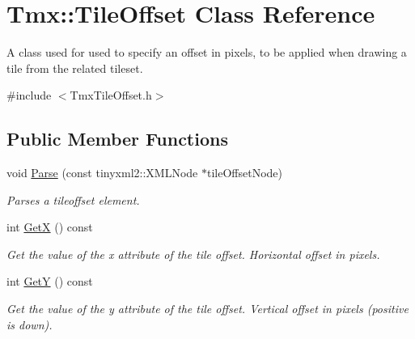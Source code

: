 \hypertarget{classTmx_1_1TileOffset}{\section{Tmx\-:\-:Tile\-Offset Class Reference}
\label{classTmx_1_1TileOffset}
}


A class used for used to specify an offset in pixels, to be applied when drawing a tile from the related tileset.  




{\ttfamily \#include $<$Tmx\-Tile\-Offset.\-h$>$}

\subsection*{Public Member Functions}
\begin{DoxyCompactItemize}
\item 
\hypertarget{classTmx_1_1TileOffset_aa3efdc7be635e7ea4aebce9f04198a30}{void \hyperlink{classTmx_1_1TileOffset_aa3efdc7be635e7ea4aebce9f04198a30}{Parse} (const tinyxml2\-::\-X\-M\-L\-Node $\ast$tile\-Offset\-Node)}\label{classTmx_1_1TileOffset_aa3efdc7be635e7ea4aebce9f04198a30}

\begin{DoxyCompactList}\small\item\em Parses a tileoffset element. \end{DoxyCompactList}\item 
\hypertarget{classTmx_1_1TileOffset_a7488905c51bb9516609e256838e61a95}{int \hyperlink{classTmx_1_1TileOffset_a7488905c51bb9516609e256838e61a95}{Get\-X} () const }\label{classTmx_1_1TileOffset_a7488905c51bb9516609e256838e61a95}

\begin{DoxyCompactList}\small\item\em Get the value of the x attribute of the tile offset. Horizontal offset in pixels. \end{DoxyCompactList}\item 
\hypertarget{classTmx_1_1TileOffset_aa17366bd769a6c807c1ca8d5b02581f0}{int \hyperlink{classTmx_1_1TileOffset_aa17366bd769a6c807c1ca8d5b02581f0}{Get\-Y} () const }\label{classTmx_1_1TileOffset_aa17366bd769a6c807c1ca8d5b02581f0}

\begin{DoxyCompactList}\small\item\em Get the value of the y attribute of the tile offset. Vertical offset in pixels (positive is down). \end{DoxyCompactList}\end{DoxyCompactItemize}


